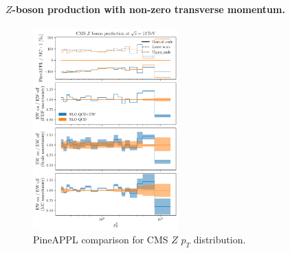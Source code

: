 \paragraph{$Z$-boson production with non-zero transverse momentum.}


\begin{figure}[!t]
    \centering
    \includegraphics[width=0.5\textwidth]{figures/pineappl_CMS_Z_13_TEV}
    \caption{PineAPPL comparison for CMS $Z$ $p_T$ distribution.}
    \label{fig:cmsZ13TeV}
\end{figure}

\noindent


